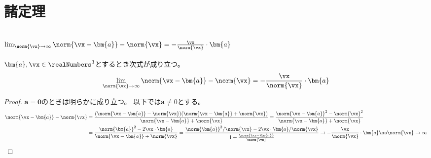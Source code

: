     \section{諸定理}
        \subsection{\texorpdfstring{$\lim_{\norm{\vx}\to\infty}\norm{\vx-\bm{a}} - \norm{\vx} = -\frac{\vx}{\norm{\vx}}\cdot\bm{a}$}{近接する2点と遠方の点との距離の差の極限}}
            \begin{shadebox}
                $\bm{a},\vx\in\realNumbers^3$とするとき次式が成り立つ。
                \[ \lim_{\norm{\vx}\to\infty}\norm{\vx-\bm{a}} - \norm{\vx} = -\frac{\vx}{\norm{\vx}}\cdot\bm{a} \]
            \end{shadebox}
            \begin{proof}
                $\bm{a}=\bm{0}$のときは明らかに成り立つ。
                以下では$\bm{a}\neq 0$とする。
                \begin{align*}
                    \norm{\vx-\bm{a}} - \norm{\vx} &= \frac{(\norm{\vx-\bm{a}} - \norm{\vx})(\norm{\vx-\bm{a}} + \norm{\vx})}{\norm{\vx-\bm{a}} + \norm{\vx}} = \frac{\norm{\vx-\bm{a}}^2 - \norm{\vx}^2}{\norm{\vx-\bm{a}} + \norm{\vx}} \\
                    &= \frac{\norm{\bm{a}}^2 - 2\vx\cdot\bm{a}}{\norm{\vx-\bm{a}} + \norm{\vx}} = \frac{\norm{\bm{a}}^2/\norm{\vx} - 2\vx\cdot\bm{a}/\norm{\vx}}{1+\frac{\norm{\vx-\bm{a}}}{\norm{\vx}}} \to -\frac{\vx}{\norm{\vx}}\cdot\bm{a} \as \norm{\vx}\to\infty
                \end{align*}
            \end{proof}